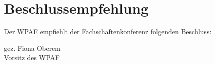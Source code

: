 \documentclass[a4paper]{scrartcl}
\newcommand{\fachschaft}{FACHSCHAFT}
\newcommand{\wahltermin}{DD. -- DD. MMMM YYYY}
\newcommand{\vorsitz}{Fiona Oberem}
\begin{document}


\section*{Beschlussempfehlung}

Der WPAF empfiehlt der Fachschaftenkonferenz folgenden Beschluss:

\vspace{1em}





gez. \vorsitz\\
Vorsitz des WPAF
\end{document}
